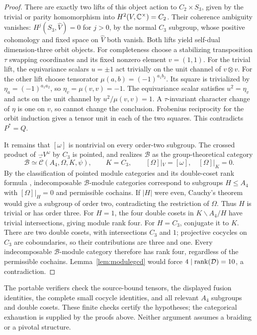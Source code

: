 \begin{proof}
There are exactly two lifts of this object action to $C_2\times S_3$, given by the trivial or parity homomorphism into $H^2(V,\mathbb C^\times)=C_2$. Their coherence ambiguity vanishes: $H^j(S_3,\widehat V)=0$ for $j>0$, by the normal $C_3$ subgroup, whose positive cohomology and fixed space on $\widehat V$ both vanish. Both lifts yield self-dual dimension-three orbit objects. For completeness choose a stabilizing transposition $\tau$ swapping coordinates and its fixed nonzero element $v=(1,1)$. For the trivial lift, the equivariance scalars $u=\pm1$ act trivially on the unit channel of $v\otimes v$. For the other lift choose tensorator $\mu(a,b)=(-1)^{a_1b_2}$. Its square is trivialized by $\eta_a=(-1)^{a_1a_2}$, so $\eta_v=\mu(v,v)=-1$. The equivariance scalar satisfies $u^2=\eta_v$ and acts on the unit channel by $u^2/\mu(v,v)=1$. A $\tau$-invariant character change of $\eta$ is one on $v$, so cannot change the conclusion. Frobenius reciprocity for the orbit induction gives a tensor unit in each of the two squares. This contradicts $P^*=Q$.

It remains that $[\omega]$ is nontrivial on every order-two subgroup. The crossed product of $\Vec_V^\omega$ by $C_3$ is pointed, and realizes $\mathcal B$ as the group-theoretical category
\[
\mathcal B\simeq\mathcal C(A_4,\Omega,K,\psi),\qquad K=C_3,
\qquad [\Omega]|_V=[\omega],\quad [\Omega]|_K=0.
\]
By the classification of pointed module categories and its double-coset rank formula \cite[Example~2.1, Theorem~3.1 and Proposition~3.1]{OstrikDouble}, indecomposable $\mathcal B$-module categories correspond to subgroups $H\le A_4$ with $[\Omega]|_H=0$ and permissible cochains. If $|H|$ were even, Cauchy's theorem would give a subgroup of order two, contradicting the restriction of $\Omega$. Thus $H$ is trivial or has order three. For $H=1$, the four double cosets in $K\backslash A_4/H$ have trivial intersections, giving module rank four. For $H=C_3$, conjugate it to $K$. There are two double cosets, with intersections $C_3$ and $1$; projective cocycles on $C_3$ are coboundaries, so their contributions are three and one. Every indecomposable $\mathcal B$-module category therefore has rank four, regardless of the permissible cochains. Lemma~\ref{lem:modulegcd} would force $4\mid\operatorname{rank}(\mathcal D)=10$, a contradiction.
\end{proof}

The portable verifiers check the source-bound tensors, the displayed fusion identities, the complete small cocycle identities, and all relevant $A_4$ subgroups and double cosets. These finite checks certify the hypotheses; the categorical exhaustion is supplied by the proofs above. Neither argument assumes a braiding or a pivotal structure.
